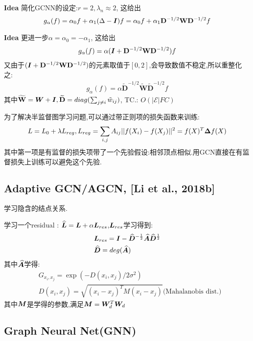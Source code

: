 \documentclass{article}
\begin{document}
\textbf{Idea} 简化GCNN的设定:$r=2,\lambda_n\approx 2$,
这给出
\begin{align}
    g_\alpha(f)
=\alpha_0 f+\alpha_1(\Delta - \boldsymbol{I})f
=\alpha_0 f+\alpha_1\mathbf{D}^{-1/2}\mathbf{W}\mathbf{D}^{-1/2}f
\end{align}

\textbf{Idea} 更进一步$\alpha=\alpha_0=-\alpha_1$,
这给出
\begin{align}
    g_\alpha(f)=\alpha (\boldsymbol{I}+\mathbf{D}^{-1/2}\mathbf{W}\mathbf{D}^{-1/2})f
\end{align}
又由于$(\boldsymbol{I}+\mathbf{D}^{-1/2}\mathbf{W}\mathbf{D}^{-1/2})$的元素取值于$[0,2]$,会导致数值不稳定,所以重整化之:
\begin{align}
    g_\alpha(f)=\alpha \widetilde{\mathbf{D}}^{-1/2}\widetilde{\mathbf{W}}\widetilde{\mathbf{D}}^{-1/2}f
\end{align}
其中$\widetilde{\mathbf{W}}=\boldsymbol{W}+\boldsymbol{I},\widetilde{\mathbf{D}}=diag(\sum_{j\neq i}\tilde w_{ij})$, TC.: $O(|\mathcal{E}|FC)$

为了解决半监督图学习问题,可以通过带正则\lop 项的损失函数来训练:
\begin{align}
    L=L_0+\lambda L_{reg}, L_{reg}=\sum_{i,j}A_{ij} ||f(X_i)-f(X_j)||^2=f(X)^T\boldsymbol{\Delta}f(X)
\end{align}
其中第一项是有监督的损失项\tRarr 带了一个先验假设:相邻顶点相似.用GCN直接在有监督损失上训练可以避免这个先验.

\subsection{Adaptive GCN/AGCN, [Li et al., 2018b]}

\tgt 学习隐含的结点关系.

 学习一个residual \lop: $\widehat{\boldsymbol{L}} = \boldsymbol{L} + \alpha \boldsymbol{L}_{res}$,$\boldsymbol{L}_{res}$学习得到:
\begin{align}
    &\boldsymbol{L}_{res} = \boldsymbol{I} - \widehat{\boldsymbol{D}}^{-\frac{1}{2}} \widehat{\boldsymbol{A}} \widehat{\boldsymbol{D}}^{\frac{1}{2}}\\
    &\widehat{\boldsymbol{D}} = deg(\widehat{\boldsymbol{A}})
\end{align}
其中$\widehat{\boldsymbol{A}}$学得:
\begin{align}
    &G_{x_i,x_j}=\exp(-D(x_i,x_j)/2\sigma^2)\\
    &D(x_i, x_j)=\sqrt{(x_i-x_j)^T M(x_i-x_j)} \text{(Mahalanobis dist.)}
\end{align}
其中$\boldsymbol{M}$是学得的参数,满足$\boldsymbol{M}=\boldsymbol{W}_d^T \boldsymbol{W}_d$

\subsection{Graph Neural Net(GNN)}
\end{document}
